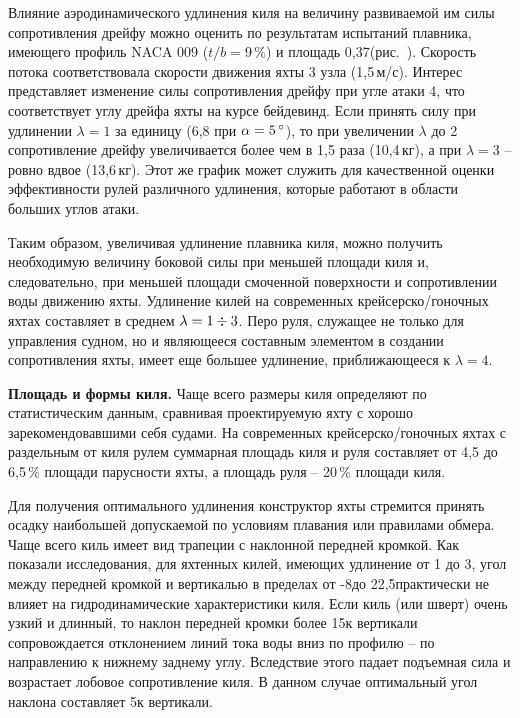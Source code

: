 Влияние аэродинамического удлинения киля на величину развиваемой им
силы сопротивления дрейфу  можно оценить по результатам
испытаний плавника, имеющего профиль NACA 009 ($t/b = 9\,\%$) и
площадь 0,37\msq (рис.~). Скорость потока соответствовала
скорости движения яхты 3 узла (1,5\,м/с). Интерес представляет
изменение силы сопротивления дрейфу при угле атаки 4\gr, что
соответствует углу дрейфа яхты на курсе бейдевинд. Если принять силу
 при удлинении $\lambda = 1$ за единицу (6,8 при
$\alpha = 5\,^\circ$), то при увеличении $\lambda$ до 2 сопротивление
дрейфу увеличивается более чем в 1,5 раза (10,4\,кг), а при
$\lambda = 3$ \--- ровно вдвое (13,6\,кг). Этот же график может
служить для качественной оценки эффективности рулей различного
удлинения, которые работают в области больших углов атаки.

Таким образом, увеличивая удлинение плавника киля, можно получить
необходимую величину боковой силы  при меньшей площади киля
и, следовательно, при меньшей площади смоченной поверхности и
сопротивлении воды движению яхты. Удлинение килей на современных
крейсерско\-/гоночных яхтах составляет в среднем
$\lambda = 1 \div 3$. Перо руля, служащее не только для управления
судном, но и являющееся составным элементом в создании сопротивления
яхты, имеет еще большее удлинение, приближающееся к $\lambda = 4$.

\textbf{Площадь и формы киля.} Чаще всего размеры киля определяют по
статистическим данным, сравнивая проектируемую яхту с хорошо
зарекомендовавшими себя судами. На современных крейсерско\-/гоночных
яхтах с раздельным от киля рулем суммарная площадь киля и руля
составляет от 4,5 до 6,5\,\% площади парусности яхты, а площадь руля
\--- 20\,\% площади киля.

Для получения оптимального удлинения конструктор яхты стремится
принять осадку наибольшей допускаемой по условиям плавания или
правилами обмера. Чаще всего киль имеет вид трапеции с наклонной
передней кромкой. Как показали исследования, для яхтенных килей,
имеющих удлинение от 1 до 3, угол между передней кромкой и вертикалью
в пределах от -8\gr до 22,5\gr практически не влияет на
гидродинамические характеристики киля. Если киль (или шверт) очень
узкий и длинный, то наклон передней кромки более 15\gr к вертикали
сопровождается отклонением линий тока воды вниз по профилю \--- по
направлению к нижнему заднему углу. Вследствие этого падает подъемная
сила и возрастает лобовое сопротивление киля. В данном случае
оптимальный угол наклона составляет 5\gr к вертикали.

